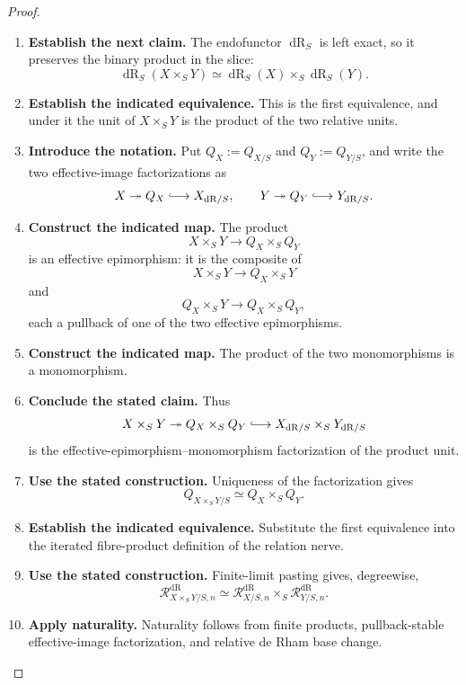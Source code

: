 \begin{proof}
\leavevmode
\begin{enumerate}[label=\textup{(\arabic*)}]
    \item \textbf{Establish the next claim.}
    The endofunctor \(\operatorname{dR}_S\) is left exact, so it preserves the
    binary product in the slice:
    \[
    \operatorname{dR}_S(X\times_SY)
    \simeq
    \operatorname{dR}_S(X)\times_S\operatorname{dR}_S(Y).
    \]
    \item \textbf{Establish the indicated equivalence.}
    This is the first equivalence, and under it the unit of \(X\times_SY\) is the
    product of the two relative units.
    \item \textbf{Introduce the notation.}
    Put \(Q_X:=Q_{X/S}\) and \(Q_Y:=Q_{Y/S}\), and write the two effective-image
    factorizations as
    \[
    X\twoheadrightarrow Q_X\lhook\joinrel\longrightarrow X_{\mathrm{dR}/S},
    \qquad
    Y\twoheadrightarrow Q_Y\lhook\joinrel\longrightarrow Y_{\mathrm{dR}/S}.
    \]
    \item \textbf{Construct the indicated map.}
    The product
    \[
    X\times_SY\longrightarrow Q_X\times_SQ_Y
    \]
    is an effective epimorphism: it is the composite of
    \[
    X\times_SY\longrightarrow Q_X\times_SY
    \]
    and
    \[
    Q_X\times_SY\longrightarrow Q_X\times_SQ_Y,
    \]
    each a pullback of one of the two effective epimorphisms.
    \item \textbf{Construct the indicated map.}
    The product of the two
    monomorphisms is a monomorphism.
    \item \textbf{Conclude the stated claim.}
    Thus
    \[
    X\times_SY
    \twoheadrightarrow
    Q_X\times_SQ_Y
    \lhook\joinrel\longrightarrow
    X_{\mathrm{dR}/S}\times_SY_{\mathrm{dR}/S}
    \]
    is the effective-epimorphism--monomorphism factorization of the product unit.
    \item \textbf{Use the stated construction.}
    Uniqueness of the factorization gives
    \[
    Q_{X\times_SY/S}\simeq Q_X\times_SQ_Y.
    \]
    \item \textbf{Establish the indicated equivalence.}
    Substitute the first equivalence into the iterated fibre-product definition of
    the relation nerve.
    \item \textbf{Use the stated construction.}
    Finite-limit pasting gives, degreewise,
    \[
    \mathcal R^{\mathrm{dR}}_{X\times_SY/S,n}
    \simeq
    \mathcal R^{\mathrm{dR}}_{X/S,n}
    \times_S
    \mathcal R^{\mathrm{dR}}_{Y/S,n}.
    \]
    \item \textbf{Apply naturality.}
    Naturality follows from finite products, pullback-stable effective-image
    factorization, and relative de Rham base change.
\end{enumerate}
\end{proof}

